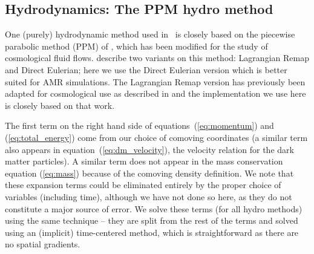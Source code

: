 \subsection{Hydrodynamics: The PPM hydro method}
\label{sec.hydro.ppm}

One (purely) hydrodynamic method used in \enzo\ is closely based on the
piecewise parabolic method (PPM) of
\citet{1984JCoPh..54..174C}, which has been
modified for the study of cosmological fluid flows.  
\citet{1984JCoPh..54..174C} describe two variants on this method:
Lagrangian Remap and Direct Eulerian; here we use the Direct Eulerian
version which is better suited for AMR simulations.  The Lagrangian
Remap version has previously been adapted for cosmological use
as described in \citet{1995CoPhC..89..149B} and the implementation
we use here is closely based on that work.

%

The first term on the right hand side of equations~(\ref{eq:momentum}) and
(\ref{eq:total_energy}) come from our choice of comoving coordinates
(a similar term also appears in equation~(\ref{eq:dm_velocity}), the velocity 
relation for the dark matter particles).  A similar term does not
appear in the mass conservation equation (\ref{eq:mass}) because
of the comoving density definition.   
We note that these expansion terms could be
eliminated entirely by the proper choice of variables (including time),
although we have not done so here, as they do not constitute a major
source of error.  
We solve these terms (for all hydro methods)
using the same technique -- they are split from the rest of the terms and
solved using an (implicit) time-centered method, which is straightforward
as there are no spatial gradients.

%

